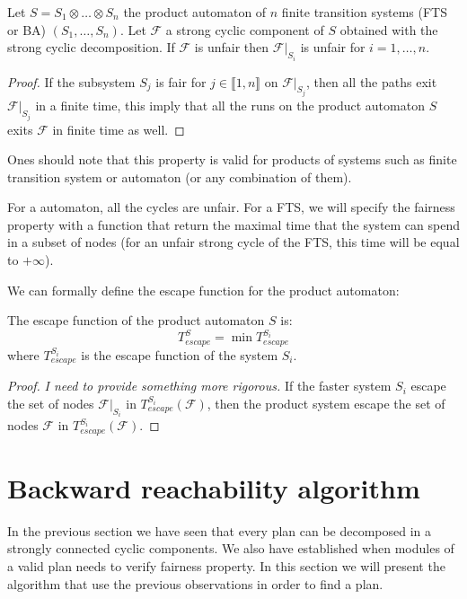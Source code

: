 \begin{prop}
Let $S = S_1 \otimes \dots \otimes S_n$ the product automaton of $n$ finite transition systems (FTS or BA) $(S_1,\dots,S_n)$.
Let $\mathcal{F}$ a strong cyclic component of $S$ obtained with the strong cyclic decomposition.
If $\mathcal{F}$ is unfair then $\mathcal{F}|_{S_i}$ is unfair for $i = 1,\dots,n$.
\end{prop}

\begin{proof}
If the subsystem $S_j$ is fair for $j \in \llbracket 1,n \rrbracket$ on $\mathcal{F}|_{S_j}$, then all the paths exit $\mathcal{F}|_{S_j}$ in a finite time, this imply that all the runs on the product automaton $S$ exits $\mathcal{F}$ in finite time as well.
\end{proof}

Ones should note that this property is valid for products of systems such as finite transition system or \buchi{} automaton (or any combination of them).

For a \buchi{} automaton, all the cycles are unfair.
For a FTS, we will specify the fairness property with a function that return the maximal time that the system can spend in a subset of nodes
(for an unfair strong cycle of the FTS, this time will be equal to $+\infty$).

We can formally define the escape function for the product automaton:
\begin{property}
The escape function of the product automaton $S$ is:
$$T_{escape}^S = \min{T_{escape}^{S_i}}$$
where $T_{escape}^{S_i}$ is the escape function of the system $S_i$.
\end{property}

\begin{proof}
\textit{I need to provide something more rigorous.}
If the faster system $S_i$ escape the set of nodes $\mathcal{F}|_{S_i}$ in $T^{S_i}_{escape}(\mathcal{F})$, then the product system escape the set of nodes $\mathcal{F}$ in $T^{S_i}_{escape}(\mathcal{F})$.
\end{proof}

\section{Backward reachability algorithm}
In the previous section we have seen that every plan can be decomposed in a strongly connected cyclic components.
We also have established when modules of a valid plan needs to verify fairness property.
In this section we will present the algorithm that use the previous observations in order to find a plan.

